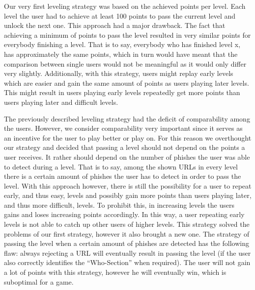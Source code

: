 \begin{description}[leftmargin=0cm]
	\item[Leveling Based on Achieved Points] Our very first leveling strategy was based on the achieved points per level.
 Each level the user had to achieve at least 100 points to pass the current level and unlock the next one.
 This approach had a major drawback.
 The fact that achieving a minimum of points to pass the level resulted in very similar points for everybody finishing a level.
 That is to say, everybody who has finished level x, has approximately the same points, which in turn would have meant that the comparison between single users would not be meaningful as it would only differ very slightly.
 Additionally, with this strategy, users might replay early levels which are easier and gain the same amount of points as users playing later levels.
 This might result in users playing early levels repeatedly get more points than users playing later and difficult levels.

	\item[Leveling Based on Detected Phishes] The previously described leveling strategy had the deficit of comparability among the users.
 However, we consider comparability very important  since it serves as an incentive for the user to play better or play on.
 For this reason we overthought our strategy and decided that passing a level should not depend on the points a user receives.
 It rather should depend on the number of phishes the user was able to detect during a level.
 That is to say, among the shown URLs in every level there is a certain amount of phishes the user has to detect in order to pass the level.
 With this approach however, there is still the possibility for a user to repeat early, and thus easy, levels and possibly gain more points than users playing later, and thus more difficult, levels.
 To prohibit this, in increasing levels the users gains and loses increasing points accordingly.
 In this way, a user repeating early levels is not able to catch up other users of higher levels.
 This strategy solved the problems of our first strategy, however it also brought a new one.
 The strategy of passing the level when a certain amount of phishes are detected has the following flaw: always rejecting a URL will eventually result in passing the level (if the user also correctly identifies the ``Who-Section'' when required). The user will not gain a lot of points with this strategy, however he will eventually win, which is suboptimal for a game.
  

\end{description}
